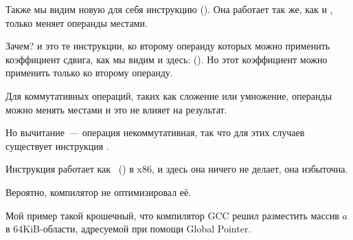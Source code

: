 Также мы видим новую для себя инструкцию \RSB ().
Она работает так же, как и \SUB, только меняет операнды местами.

Зачем?
\SUB и \RSB это те инструкции, ко второму операнду которых можно применить коэффициент сдвига, как мы видим и здесь: (). 
Но этот коэффициент можно применить только ко второму операнду.

Для коммутативных операций, таких как сложение или умножение, 
операнды можно менять местами и это не влияет на результат.

Но вычитание~--- операция некоммутативная, так что для этих случаев существует инструкция \RSB.

Инструкция  работает как \LEA~() в x86, и здесь она ничего не делает, она избыточна.

Вероятно, компилятор не оптимизировал её.



Мой пример такой крошечный, что компилятор GCC решил разместить массив $a$ в 64KiB-области,
адресуемой при помощи Global Pointer.




